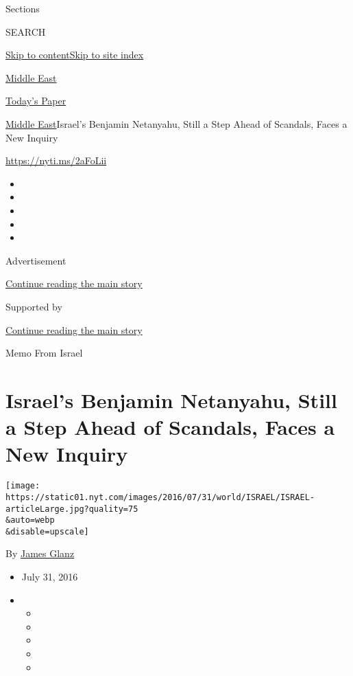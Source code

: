 Sections

SEARCH

\protect\hyperlink{site-content}{Skip to
content}\protect\hyperlink{site-index}{Skip to site index}

\href{https://www.nytimes.com/section/world/middleeast}{Middle East}

\href{https://myaccount.nytimes.com/auth/login?response_type=cookie\&client_id=vi}{}

\href{https://www.nytimes.com/section/todayspaper}{Today's Paper}

\href{/section/world/middleeast}{Middle East}\textbar{}Israel's Benjamin
Netanyahu, Still a Step Ahead of Scandals, Faces a New Inquiry

\url{https://nyti.ms/2aFoLii}

\begin{itemize}
\item
\item
\item
\item
\item
\end{itemize}

Advertisement

\protect\hyperlink{after-top}{Continue reading the main story}

Supported by

\protect\hyperlink{after-sponsor}{Continue reading the main story}

Memo From Israel

\hypertarget{israels-benjamin-netanyahu-still-a-step-ahead-of-scandals-faces-a-new-inquiry}{%
\section{Israel's Benjamin Netanyahu, Still a Step Ahead of Scandals,
Faces a New
Inquiry}\label{israels-benjamin-netanyahu-still-a-step-ahead-of-scandals-faces-a-new-inquiry}}

\texttt{[image: https://static01.nyt.com/images/2016/07/31/world/ISRAEL/ISRAEL-articleLarge.jpg?quality=75\\\&auto=webp\\\&disable=upscale]}

By \href{http://www.nytimes.com/by/james-glanz}{James Glanz}

\begin{itemize}
\item
  July 31, 2016
\item
  \begin{itemize}
  \item
  \item
  \item
  \item
  \item
  \end{itemize}
\end{itemize}

